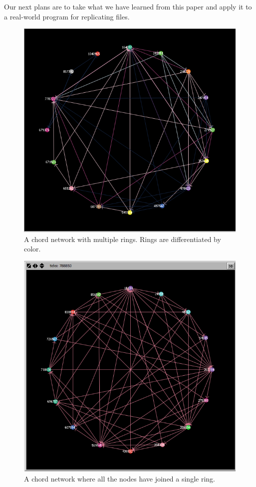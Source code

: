 \documentclass[12pt]{article} %
\begin{document}
Our next plans are to take what we have learned from this paper and apply it to a real-world program for replicating files.



\begin{figure}
\includegraphics[width=\linewidth]{example_problem}
\caption{A chord network with multiple rings.  Rings are differentiated by color.}
\label{problem}
\end{figure}


\begin{figure}
\includegraphics[width=\linewidth]{fixed_example}
\caption{A chord network where all the nodes have joined a single ring.}
\label{fixed}
\end{figure}








\end{document}
